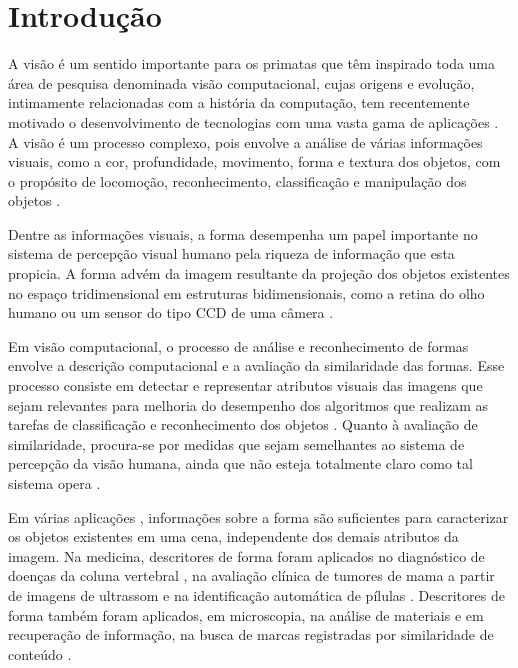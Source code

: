 
\chapter{Introdução \label{chap:INTRO}}


A visão é um sentido importante para os primatas que têm inspirado toda uma área de pesquisa denominada visão computacional, cujas origens e evolução, intimamente relacionadas com a história da computação, tem recentemente motivado o desenvolvimento de tecnologias com uma vasta gama de aplicações \cite{Costa:2009}. A visão é um processo complexo, pois envolve a análise de várias informações visuais, como a cor, profundidade, movimento, forma e textura dos objetos, com o propósito de locomoção, reconhecimento, classificação e manipulação dos objetos \cite{Ullman:1996}.

Dentre as informações visuais, a forma desempenha um papel importante no sistema de percepção visual humano pela riqueza de informação que esta propicia. A forma advém da imagem resultante da projeção dos objetos existentes no espaço tridimensional em estruturas bidimensionais, como a retina do olho humano ou um sensor do tipo \acf{CCD}  de uma câmera \cite{Costa:2009}.

Em visão computacional, o processo de análise e reconhecimento de formas envolve a descrição computacional e a avaliação da similaridade das formas. Esse processo consiste em detectar e representar atributos visuais das imagens que sejam relevantes para melhoria do desempenho dos algoritmos que realizam as tarefas de classificação e reconhecimento dos objetos \cite{Escolano:2009}. Quanto à avaliação de similaridade, procura-se por medidas que sejam semelhantes ao sistema de percepção da visão humana, ainda que não esteja totalmente claro como tal sistema opera \cite{4815272}. 

Em várias aplicações \cite{Zhang201661,Zhao20153203}, informações sobre a forma são suficientes para caracterizar os objetos existentes em uma cena, independente dos demais atributos da imagem. Na medicina, descritores de forma foram aplicados no diagnóstico de doenças da coluna vertebral \cite{Lee:2009}, na avaliação clínica de tumores de mama a partir de imagens de ultrassom \cite{Yang:2009} e na identificação automática de pílulas \cite{Ushizima:2015}.  Descritores de forma também foram aplicados, em microscopia, na análise de materiais \cite{Zhang201661} e em recuperação de informação, na busca de marcas registradas por similaridade de conteúdo \cite{MohdAnuar2013105,Qi20102017}.

